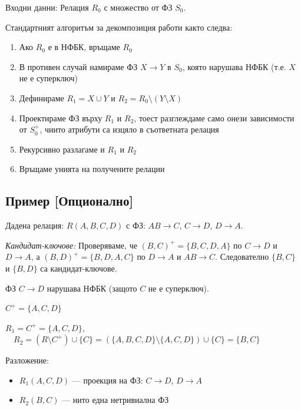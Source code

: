 \documentclass{scrartcl}
\begin{document}
\begin{FlushLeft}
Входни данни: Релация $R_0$ с множество от ФЗ $S_0$.

Стандартният алгоритъм за декомпозиция работи както следва:

\begin{enumerate}
    \item Ако $R_0$ е в НФБК, връщаме $R_0$
    
    \item В противен случай намираме ФЗ $X \rightarrow Y$ в $S_0$, която нарушава НФБК (т.е. $X$ не е суперключ)
    
    \item Дефинираме $R_1 = X \cup Y$ и $R_2 = R_0 \setminus (Y \setminus X)$
    
    \item Проектираме ФЗ върху $R_1$ и $R_2$, тоест разглеждаме само онези зависимости от $S_0^+$, чиито атрибути са изцяло в съответната релация
    
    \item Рекурсивно разлагаме и $R_1$ и $R_2$
    
    \item Връщаме унията на получените релации
\end{enumerate}

\subsection{Пример [Опционално]}

Дадена релация: $R(A, B, C, D)$ с ФЗ: $AB \rightarrow C$, $C \rightarrow D$, $D \rightarrow A$.

\textit{Кандидат-ключове:} Проверяваме, че $(B, C)^+ = \{B, C, D, A\}$ по $C \rightarrow D$ и $D \rightarrow A$, а $(B, D)^+ = \{B, D, A, C\}$ по $D \rightarrow A$ и $AB \rightarrow C$. Следователно $\{B, C\}$ и $\{B, D\}$ са кандидат-ключове.

ФЗ $C \rightarrow D$ нарушава НФБК (защото $C$ не е суперключ).

$C^+ = \{A, C, D\}$

$R_1 = C^+ = \{A, C, D\}$, $\quad R_2 = (R \setminus C^+) \cup \{C\} = (\{A,B,C,D\} \setminus \{A,C,D\}) \cup \{C\} = \{B, C\}$

Разложение:
\begin{itemize}
    \item $R_1(A, C, D)$ --- проекция на ФЗ: $C \rightarrow D$, $D \rightarrow A$
    \item $R_2(B, C)$ --- нито една нетривиална ФЗ
\end{itemize}


\end{FlushLeft}
\end{document}
